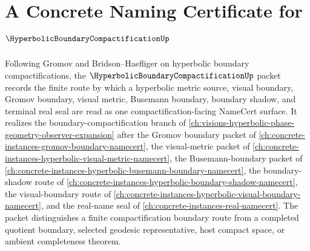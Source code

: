 \chapter{A Concrete Naming Certificate for $\HyperbolicBoundaryCompactificationUp$}
\label{ch:concrete-instances-hyperbolic-boundary-compactification-namecert}

Following Gromov and Bridson--Haefliger on hyperbolic boundary compactifications, the $\HyperbolicBoundaryCompactificationUp$ packet records the finite route by which a hyperbolic metric source, visual boundary, Gromov boundary, visual metric, Busemann boundary, boundary shadow, and terminal real seal are read as one compactification-facing NameCert surface. It realizes the boundary-compactification branch of \autoref{ch:visions-hyperbolic-phase-geometry-observer-expansion} after the Gromov boundary packet of \autoref{ch:concrete-instances-gromov-boundary-namecert}, the visual-metric packet of \autoref{ch:concrete-instances-hyperbolic-visual-metric-namecert}, the Busemann-boundary packet of \autoref{ch:concrete-instances-hyperbolic-busemann-boundary-namecert}, the boundary-shadow route of \autoref{ch:concrete-instances-hyperbolic-boundary-shadow-namecert}, the visual-boundary route of \autoref{ch:concrete-instances-hyperbolic-visual-boundary-namecert}, and the real-name seal of \autoref{ch:concrete-instances-real-namecert}. The packet distinguishes a finite compactification boundary route from a completed quotient boundary, selected geodesic representative, host compact space, or ambient completeness theorem.

